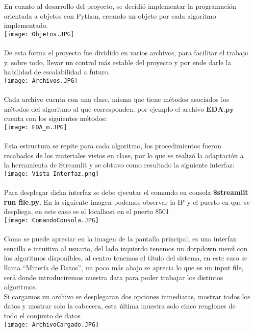 \documentclass[10pt,a4paper]{article}
\begin{document}
En cuanto al desarrollo del proyecto, se decidió implementar la programación orientada a objetos con Python, creando un objeto por cada algoritmo implementado. 
\\
\texttt{[image: Objetos.JPG]}
\\ \\
De esta forma el proyecto fue dividido en varios archivos, para facilitar el trabajo y, sobre todo, llevar un control más estable del proyecto y por ende darle la habilidad de escalabilidad a futuro.\\
\texttt{[image: Archivos.JPG]}
\\ \\
Cada archivo cuenta con una clase, misma que tiene métodos asociados los métodos del algoritmo al que corresponden, por ejemplo el archivo $\textbf{EDA.py}$ cuenta con los siguientes métodos:  
\\
\texttt{[image: EDA\_m.JPG]}
\\ \\ 
Esta estructura se repite para cada algoritmo, los procedimientos fueron recabados de los materiales vistos en clase, por lo que se realizó la adaptación a la herramienta de Streamlit y se obtuvo como resultado la siguiente interfaz: \\
\texttt{[image: Vista Interfaz.png]}
\\ \\
Para desplegar dicha interfaz se debe ejecutar el comando en consola \textbf{\$streamlit run file.py}. En la siguiente imagen podemos observar la IP y el puerto en que se despliega, en este caso es el localhost en el puerto 8501 \\
\texttt{[image: ComandoConsola.JPG]}
\\ \\
Como se puede apreciar en la imagen de la pantalla principal, es una interfaz sencilla e intuitiva al usuario, del lado izquierdo tenemos un dorpdown menú con los algoritmos disponibles, al centro tenemos el título del sistema, en este caso se llama “Minería de Datos”, un poco más abajo se aprecia lo que es un input file, será donde introduciremos nuestra data para poder trabajar los distintos algoritmos. \\

Si cargamos un archivo se desplegaran dos opciones inmediatas, mostrar todos los datos y mostrar solo la cabecera, esta última muestra solo cinco renglones de todo el conjunto de datos\\
\texttt{[image: ArchivoCargado.JPG]}
\\ \\
\end{document}
